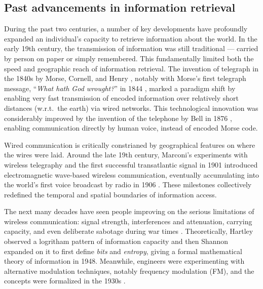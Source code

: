 \documentclass[project-plan]{report-template}
\begin{document}
\subsection{Past advancements in information retrieval}
During the past two centuries, a number of key developments have profoundly
expanded an individual's capacity to retrieve information about the world. In
the early 19th century, the transmission of information was still traditional
--- carried by person on paper or simply remembered. This fundamentally limited
both the speed and geographic reach of information retrieval. The invention of
telegraph in the 1840s by Morse, Cornell, and Henry \cite{history.telegraph.1,
history.telegraph.2}, notably with Morse's first telegraph message,
``\emph{What hath God wrought?}'' in 1844 \cite{first.telegraph.msg}, marked a
paradigm shift by enabling very fast transmission of encoded information over
relatively short distances (w.r.t.\ the earth) via wired networks.  This
technological innovation was considerably improved by the invention of the
telephone by Bell in 1876 \cite{history.telephone.1, history.telephone.2},
enabling communication directly by human voice, instead of encoded Morse code.

Wired communication is critically constrianed by geographical
features on where the wires were laid. Around the late 19th century, 
Marconi's experiments with wireless telegraphy \cite{history.wireless.1} and
the first successful transatlantic signal in 1901
\cite{history.first.atlantic.broadcast} introduced electromagnetic wave-based
wireless communication, eventually accumulating into the world's first voice
broadcast by radio in 1906 \cite{first.voice.broadcast}. These milestones
collectively redefined the temporal and spatial boundaries of information
access.

The next many decades have seen people improving on the serious limitations of
wireless communication: signal strength, interferences and attenuation,
carrying capacity, and even deliberate sabotage during war times
\cite{wireless.weakness.1, wireless.weakness.2, wireless.weakness.3}.
Theoretically, Hartley observed a logritham pattern of information capacity
\cite{hartley.log.information} and then Shannon expanded on it to first define
\emph{bits} and \emph{entropy}, giving a formal mathematical theory of
information \cite{shannon.theory.communication} in 1948. Meanwhile,
engineers were experimenting with alternative modulation techniques, notably
frequency modulation (FM), and the concepts were formalized in the 1930s
\cite{history.modulation}. 
\end{document}
